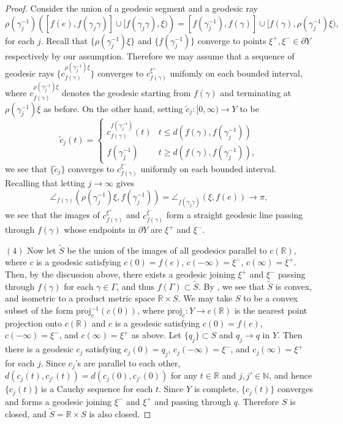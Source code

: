 \documentclass[12pt]{amsart}
\numberwithin{equation}{section}
\theoremstyle{plain}
\theoremstyle{definition}
\theoremstyle{remark}
\newcommand{\R}{{\mathbb R}}
\newcommand{\N}{{\mathbb N}}
\newcommand{\nrprj}{\mathrm{proj}}
\newcommand{\ray}[1]{[#1)}
\newcommand{\cc}[2]{c_{#1}^{#2}}
\begin{document}
\begin{proof}
Consider the union of a geodesic segment and a geodesic ray
\begin{equation*}
 \rho(\gamma_j^{-1})
  \left( [f(e), f(\gamma_j\gamma)] \cup [f(\gamma_j\gamma), \xi)
  \right)
 = [f(\gamma_j^{-1}), f(\gamma)]\cup [f(\gamma),
 \rho(\gamma_j^{-1})\xi), 
\end{equation*}
for each $j$. 
Recall that 
$\{\rho(\gamma_j^{-1})\xi\}$ and $\{f(\gamma_j^{-1})\}$ converge
to points $\xi^+, \xi^-\in \partial Y$ respectively by our
assumption. 
Therefore we may assume that a sequence of geodesic rays 
$\{\cc{f(\gamma)}{\rho(\gamma_j^{-1})\xi}\}$ converges to
$\cc{f(\gamma)}{\xi^+}$ unifomly on each bounded interval, 
where $\cc{f(\gamma)}{\rho(\gamma_j^{-1})\xi}$ denotes the
geodesic starting from $f(\gamma)$ and terminating at 
$\rho(\gamma_j^{-1})\xi$ as before. 
On the other hand, setting 
$\tilde c_j \colon \ray{0,\infty}\rightarrow Y$ to be
\begin{equation*}
 \tilde c_j(t)=
 \begin{cases}
  \cc{f(\gamma)}{f(\gamma_j^{-1})} (t) & t \leq
  d(f(\gamma),f(\gamma_j^{-1})) \\
  f(\gamma_j^{-1}) & t \geq d(f(\gamma),f(\gamma_j^{-1})), 
 \end{cases}
\end{equation*}
we see that $\{\tilde c_j\}$ converges to $\cc{f(\gamma)}{\xi^-}$
 uniformly on each bounded interval. 
Recalling that letting $j\to \infty$ gives
\begin{equation*}
 \angle_{f(\gamma)}(\rho(\gamma_j^{-1})\xi,f(\gamma_j^{-1}))
  = \angle_{f(\gamma_j\gamma)} (\xi, f(e)) \to \pi, 
\end{equation*}
we see that the images of $\cc{f(\gamma)}{\xi^+}$ and
$\cc{f(\gamma)}{\xi^-}$ form a straight geodesic line passing through
$f(\gamma)$ whose endpoints in $\partial Y$ are $\xi^+$ and $\xi^-$.


%
%
$(4)$ Now let $\tilde S$ be the union of the images of all geodesics
parallel to $c(\R)$, where $c$ is a geodesic satisfying $c(0)=f(e)$,
$c(-\infty)=\xi^-$, $c(\infty)=\xi^+$. 
Then, by the discussion above, there exists a geodesic
joining $\xi^+$ and $\xi^-$ passing through $f(\gamma)$ for each 
$\gamma \in \Gamma$, and thus
$f(\Gamma)\subset \tilde S$.  
By \cite[p.~183 2.14]{bridson-haefliger}, we see that 
$\tilde S$ is convex, and isometric to a product metric
space $\R \times S$. 
We may take $S$ to be a 
convex subset of the form $\nrprj_{c}^{-1}(c(0))$,
where $\nrprj_{c} \colon Y \rightarrow c(\R)$ is the nearest point
projection onto $c(\R)$ and $c$ is a geodesic satisfying $c(0)=f(e)$,
$c(-\infty)=\xi^-$, and $c(\infty)=\xi^+$ as above.  
Let $\{q_j\} \subset S$ and $q_j \to q$ in $Y$. Then
there is a geodesic $c_j$ satisfying $c_j(0)=q_j$, $c_j(-\infty)=\xi^-$,
and $c_j(\infty)=\xi^+$ for each $j$.  Since $c_j$'s are parallel to each
other, $d(c_j(t), c_{j'}(t))=d(c_j(0),c_{j'}(0))$ for any $t \in \R$ and
$j, j' \in\N$, and hence $\{c_j(t)\}$ is a Cauchy sequence for each $t$. 
Since $Y$ is complete, $\{c_j(t)\}$ converges and forms a geodesic
joining $\xi^-$ and $\xi^+$ and passing through $q$.  Therefore $S$ is
closed, and $\tilde S=\R \times S$ is also closed. 


\end{proof}
\end{document}
